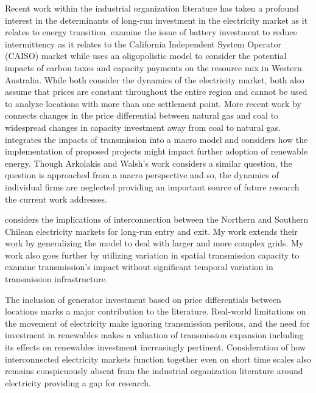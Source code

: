 \documentclass[12pt]{article}
\begin{document}
Recent work within the industrial organization literature has taken a profound interest in the determinants of long-run investment in the electricity market as it relates to energy transition. \cite{butters2021soaking} examine the issue of battery investment to reduce intermittency as it relates to the California Independent System Operator (CAISO) market while \cite{elliott2022investment} uses an oligopolistic model to consider the potential impacts of carbon taxes and capacity payments on the resource mix in Western Australia. While both consider the dynamics of the electricity market, both also assume that prices are constant throughout the entire region and cannot be used to analyze locations with more than one settlement point.  More recent work by \cite{gowrisankaran2024energy} connects changes in the price differential between natural gas and coal to widespread changes in capacity investment away from coal to natural gas. \cite{arkolakis2023clean} integrates the impacts of transmission into a macro model and considers how the implementation of proposed projects might impact further adoption of renewable energy. Though Arkolakis and Walsh's work considers a similar question, the question is approached from a macro perspective and so, the dynamics of individual firms are neglected providing an important source of future research the current work addresses. 

\cite{gonzales2022dynamic} considers the implications of interconnection between the Northern and Southern Chilean electricity markets for long-run entry and exit. My work extends their work by generalizing the model to deal with larger and more complex grids. My work also goes further by utilizing variation in spatial transmission capacity to examine transmission's impact without significant temporal variation in transmission infrastructure.

The inclusion of generator investment based on price differentials between locations marks a major contribution to the literature. Real-world limitations on the movement of electricity make ignoring transmission perilous, and the need for investment in renewables makes a valuation of transmission expansion including its effects on renewables investment increasingly pertinent. Consideration of how interconnected electricity markets function together even on short time scales also remains conspicuously absent from the industrial organization literature around electricity providing a gap for research. 
\end{document}
